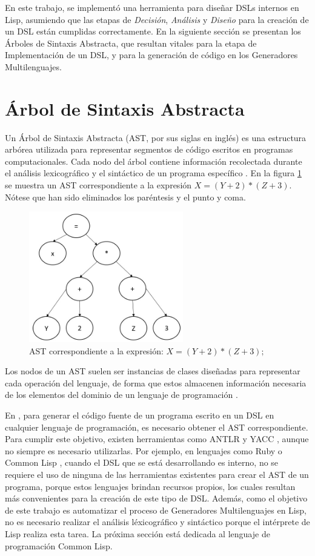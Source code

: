 En este trabajo, se implementó una herramienta para diseñar DSLs internos en Lisp, asumiendo que las etapas de \textit{Decisión}, \textit{Análisis} y \textit{Diseño} para la creación de un DSL están cumplidas correctamente. En la siguiente sección se presentan los {Árboles de Sintaxis Abstracta}, que resultan vitales para la etapa de Implementación de un DSL, y para la generación de código en los Generadores Multilenguajes.

\section{Árbol de Sintaxis Abstracta }
Un Árbol de Sintaxis Abstracta (AST, por sus siglas en inglés) es una estructura arbórea utilizada para representar segmentos de código escritos en programas computacionales.  Cada nodo del árbol contiene información recolectada durante el análisis lexicográfico y el sintáctico de un programa específico \cite{AST}. En la figura \ref{AST1} se muestra un AST correspondiente a la expresión $X= (Y+2) * (Z+3)$.  
Nótese que han sido eliminados los paréntesis y el punto y coma.

\begin{figure}
	\centering
	\includegraphics[width=0.6\textwidth]{AST1.png}
	\caption{AST correspondiente a la expresión: $X = (Y+2) * (Z+3);$}
	\label{AST1}
\end{figure}


Los nodos de un AST suelen ser instancias de clases diseñadas para representar cada operación del lenguaje, de forma que estos almacenen información necesaria de los elementos del dominio de un lenguaje de programación \cite{AST}. 

En {\gagm}, para generar el código fuente de un programa escrito en un DSL en cualquier lenguaje de programación, es necesario obtener el AST correspondiente. Para cumplir este objetivo, existen herramientas como ANTLR \cite{antlr} y YACC \cite{yacc}, aunque no siempre es necesario utilizarlas. Por ejemplo, en lenguajes como Ruby \cite{ruby} o Common Lisp \cite{clos-overview}, cuando el DSL que se está desarrollando es interno, no se requiere el uso de ninguna de las herramientas existentes para crear el AST de un programa, porque estos lenguajes brindan recursos propios, los cuales resultan más convenientes para la creación de este tipo de DSL. Además, como el objetivo de este trabajo es automatizar el proceso de Generadores Multilenguajes en Lisp, no es necesario realizar el análisis léxicográfico y sintáctico porque el intérprete de Lisp realiza esta tarea. La próxima sección está dedicada al lenguaje de programación Common Lisp.

